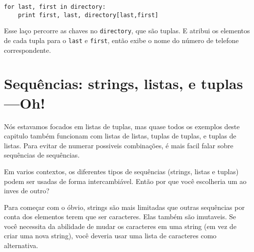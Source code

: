 
\beforeverb
\begin{verbatim}
for last, first in directory:
    print first, last, directory[last,first]
\end{verbatim}
\afterverb
%
Esse laço percorre as chaves no {\tt directory}, que são tuplas. E
atribui os elementos de cada tupla para o {\tt last} e {\tt first},
então exibe o nome do número de telefone correspondente.

\section{Sequências: strings, listas, e tuplas---Oh!}

Nós estavamos focados em listas de tuplas, mas quase todos os exemplos
deste capitulo também funcionam com listas de listas, tuplas de tuplas,
e tuplas de listas. Para evitar de numerar possiveis combinações, é
mais facil falar sobre sequências de sequências.

Em varios contextos, os diferentes tipos de sequências (strings, listas e
tuplas) podem ser usadas de forma intercambiável. Então por que você
escolheria um ao inves de outro?


Para começar com o óbvio, strings são mais limitadas que outras
sequências por conta dos elementos terem que ser caracteres. Elas
também são imutaveis. Se você necessita da abilidade de mudar os
caracteres em uma string (em vez de criar uma nova string), você 
deveria usar uma lista de caracteres como alternativa.

